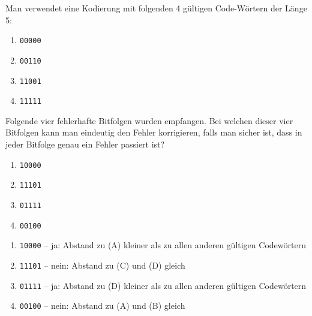 \begin{myexercise}
	Man verwendet eine Kodierung mit folgenden 4 gültigen Code-Wörtern der Länge 5:
	\begin{enumerate}[label=(\Alph*)]
		\item \texttt{00000}
		\item \texttt{00110}
		\item \texttt{11001}
		\item \texttt{11111}
	\end{enumerate}
	Folgende vier fehlerhafte Bitfolgen wurden empfangen. Bei welchen dieser vier Bitfolgen kann man eindeutig den Fehler korrigieren, falls man sicher ist, dass in jeder Bitfolge genau ein Fehler passiert ist?
	\begin{enumerate}
		\item \texttt{10000}
		\item \texttt{11101}
		\item \texttt{01111}
		\item \texttt{00100}
	\end{enumerate}

	\begin{myanswer}
		\begin{enumerate}
			\item \texttt{10000} -- ja: Abstand zu (A) kleiner als zu allen anderen gültigen Codewörtern
			\item \texttt{11101} -- nein: Abstand zu (C) und (D) gleich
			\item \texttt{01111} -- ja: Abstand zu (D) kleiner als zu allen anderen gültigen Codewörtern
			\item \texttt{00100} -- nein: Abstand zu (A) und (B) gleich
		\end{enumerate}
	\end{myanswer}
\end{myexercise}



